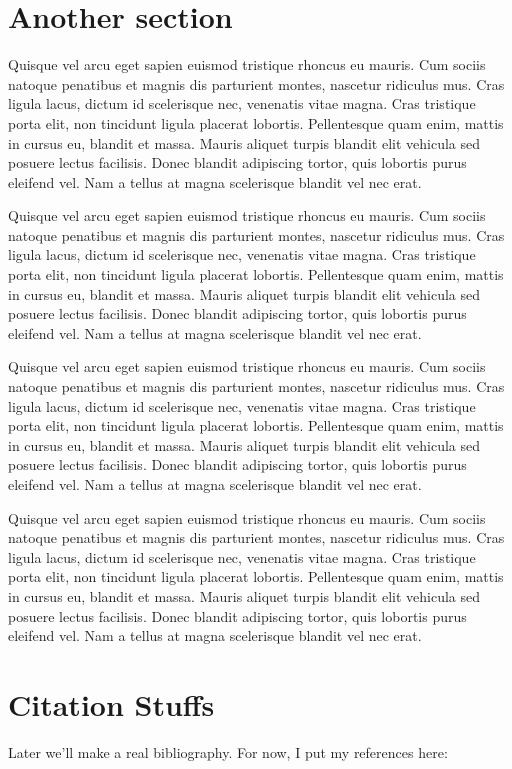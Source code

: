 \documentclass[twoside]{article}
\begin{document}
\begin{multicols}{2}
\section{Another section}
Quisque vel arcu eget sapien euismod tristique rhoncus eu mauris. Cum sociis natoque penatibus et magnis dis parturient montes, nascetur ridiculus mus. Cras ligula lacus, dictum id scelerisque nec, venenatis vitae magna. Cras tristique porta elit, non tincidunt ligula placerat lobortis. Pellentesque quam enim, mattis in cursus eu, blandit et massa. Mauris aliquet turpis blandit elit vehicula sed posuere lectus facilisis. Donec blandit adipiscing tortor, quis lobortis purus eleifend vel. Nam a tellus at magna scelerisque blandit vel nec erat.

Quisque vel arcu eget sapien euismod tristique rhoncus eu mauris. Cum sociis natoque penatibus et magnis dis parturient montes, nascetur ridiculus mus. Cras ligula lacus, dictum id scelerisque nec, venenatis vitae magna. Cras tristique porta elit, non tincidunt ligula placerat lobortis. Pellentesque quam enim, mattis in cursus eu, blandit et massa. Mauris aliquet turpis blandit elit vehicula sed posuere lectus facilisis. Donec blandit adipiscing tortor, quis lobortis purus eleifend vel. Nam a tellus at magna scelerisque blandit vel nec erat.

Quisque vel arcu eget sapien euismod tristique rhoncus eu mauris. Cum sociis natoque penatibus et magnis dis parturient montes, nascetur ridiculus mus. Cras ligula lacus, dictum id scelerisque nec, venenatis vitae magna. Cras tristique porta elit, non tincidunt ligula placerat lobortis. Pellentesque quam enim, mattis in cursus eu, blandit et massa. Mauris aliquet turpis blandit elit vehicula sed posuere lectus facilisis. Donec blandit adipiscing tortor, quis lobortis purus eleifend vel. Nam a tellus at magna scelerisque blandit vel nec erat.

Quisque vel arcu eget sapien euismod tristique rhoncus eu mauris. Cum sociis natoque penatibus et magnis dis parturient montes, nascetur ridiculus mus. Cras ligula lacus, dictum id scelerisque nec, venenatis vitae magna. Cras tristique porta elit, non tincidunt ligula placerat lobortis. Pellentesque quam enim, mattis in cursus eu, blandit et massa. Mauris aliquet turpis blandit elit vehicula sed posuere lectus facilisis. Donec blandit adipiscing tortor, quis lobortis purus eleifend vel. Nam a tellus at magna scelerisque blandit vel nec erat.

\section{Citation Stuffs}
Later we'll make a real bibliography. For now, I put my references here:
\end{multicols}
\end{document}
